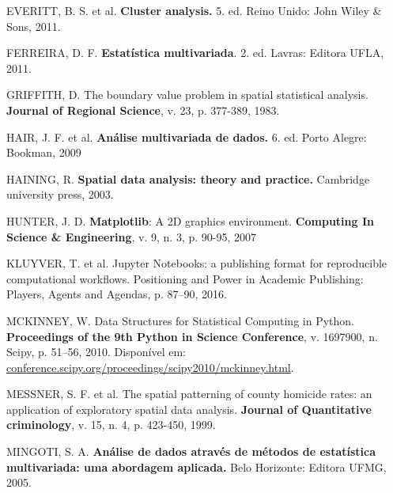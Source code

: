 \documentclass[12pt, a4paper,brazil,oneside]{article}
\begin{document}
\begin{thebibliography}{99}
		{EVERITT, B. S. et al. \textbf{Cluster analysis.} 5. ed. Reino Unido: John Wiley \& Sons, 2011.}
		
		{FERREIRA, D. F. \textbf{Estatística multivariada}. 2. ed. Lavras: Editora UFLA, 2011.}
		
		{GRIFFITH, D. The boundary value problem in spatial statistical analysis. \textbf{Journal of Regional Science}, v. 23, p. 377-389, 1983.}
		
		{HAIR, J. F. et al. \textbf{Análise multivariada de dados.} 6. ed. Porto Alegre: Bookman, 2009}
		
		{HAINING, R. \textbf{Spatial data analysis: theory and practice.} Cambridge university press, 2003.}
		
		{HUNTER, J. D. \textbf{Matplotlib}: A 2D graphics environment. \textbf{Computing In Science \& Engineering}, v. 9, n. 3, p. 90-95, 2007}
		
		{KLUYVER, T. et al. Jupyter Notebooks: a publishing format for reproducible computational workflows. Positioning and Power in Academic Publishing: Players, Agents and Agendas, p. 87–90, 2016.}
		
		{MCKINNEY, W. Data Structures for Statistical Computing in Python. \textbf{Proceedings of the 9th Python in Science Conference}, v. 1697900, n. Scipy, p. 51–56, 2010. Disponível em: \url{conference.scipy.org/proceedings/scipy2010/mckinney.html}.}
		
		{MESSNER, S. F. et al.  The spatial patterning of county homicide rates: an application of exploratory spatial data analysis. \textbf{Journal of Quantitative criminology}, v. 15, n. 4, p. 423-450, 1999.}
		
		{MINGOTI, S. A. \textbf{Análise de dados através de métodos de estatística multivariada: uma abordagem aplicada.} Belo Horizonte: Editora UFMG, 2005.}
		

\end{thebibliography}
\end{document}
